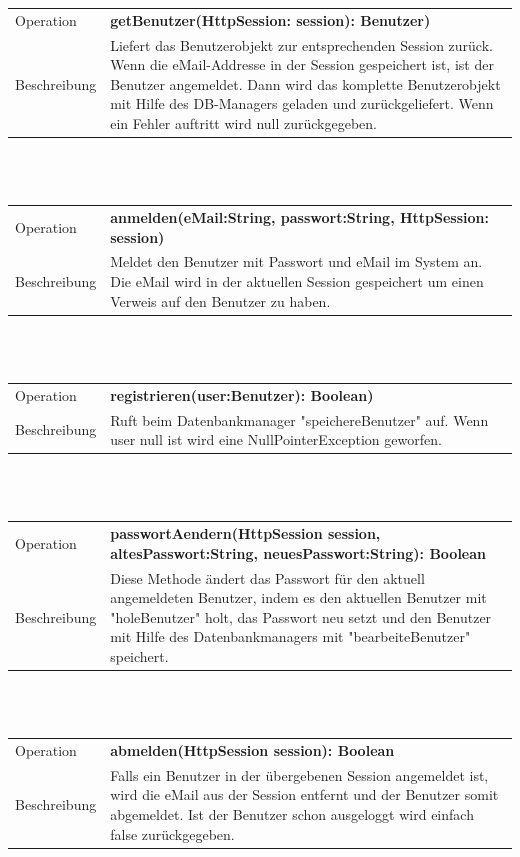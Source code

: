 \documentclass[12pt]{scrreprt}
\begin{document}
\begin{tabular}{|lp{12cm}|}
	\hline
	Operation &  \textbf{getBenutzer(HttpSession: session): Benutzer) }\\ 
	Beschreibung & Liefert das Benutzerobjekt zur entsprechenden Session zurück. Wenn die eMail-Addresse in der Session gespeichert ist, ist der Benutzer angemeldet. Dann wird das komplette Benutzerobjekt mit Hilfe des DB-Managers geladen und zurückgeliefert. Wenn ein Fehler auftritt wird null zurückgegeben.\\
	\hline 
\end{tabular} \\\\


\begin{tabular}{|lp{12cm}|}
	\hline
	Operation &  \textbf{anmelden(eMail:String, passwort:String, HttpSession: session) }\\ 
	Beschreibung & Meldet den Benutzer mit Passwort und eMail im System an. Die eMail wird in der aktuellen Session gespeichert um einen Verweis auf den Benutzer zu haben. \\ 
	\hline 
\end{tabular} \\\\

\begin{tabular}{|lp{12cm}|}
	\hline
	Operation &  \textbf{registrieren(user:Benutzer): Boolean) }\\ 
	Beschreibung & Ruft beim Datenbankmanager "speichereBenutzer" auf. Wenn user null ist wird eine NullPointerException geworfen. \\ 
	\hline 
\end{tabular} \\\\

\begin{tabular}{|lp{12cm}|}
	\hline
	Operation &  \textbf{passwortAendern(HttpSession session, altesPasswort:String, neuesPasswort:String): Boolean }\\ 
	Beschreibung & Diese Methode ändert das Passwort für den aktuell angemeldeten Benutzer, indem es den aktuellen Benutzer mit "holeBenutzer" holt, das Passwort neu setzt und den Benutzer mit Hilfe des Datenbankmanagers mit "bearbeiteBenutzer" speichert.\\ 
	\hline 
\end{tabular} \\\\

\begin{tabular}{|lp{12cm}|}
	\hline
	Operation &  \textbf{abmelden(HttpSession session): Boolean }\\ 
	Beschreibung & Falls ein Benutzer in der übergebenen Session angemeldet ist, wird die eMail aus der Session entfernt und der Benutzer somit abgemeldet. Ist der Benutzer schon ausgeloggt wird einfach false zurückgegeben.\\ 
	\hline 
\end{tabular} \\\\
\end{document}
